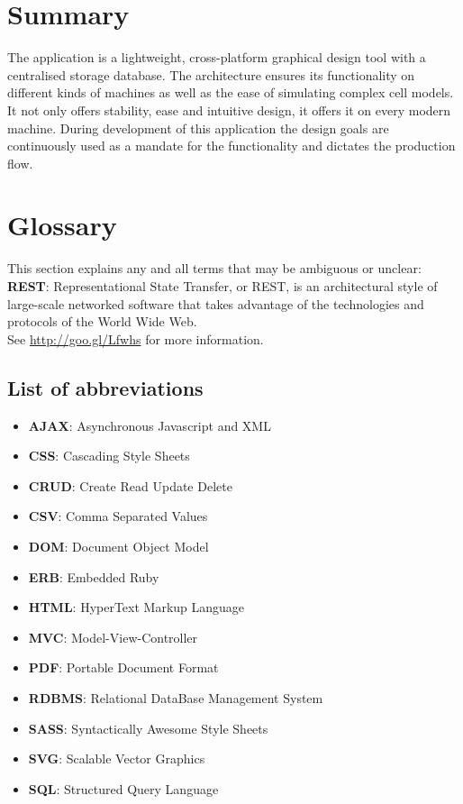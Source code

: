 \documentclass{report}
\begin{document}
	\section{Summary}
		The application is a lightweight, cross-platform graphical design tool with a centralised storage database. The architecture ensures its functionality on different kinds of machines as well as the ease of simulating complex cell models. It not only offers stability, ease and intuitive design, it offers it on every modern machine. During development of this application the design goals are continuously used as a mandate for the functionality and dictates the production flow.
	\section{Glossary}
		This section explains any and all terms that may be ambiguous or unclear:\\
		
		\textbf{REST}: Representational State Transfer, or REST, is an architectural style of large-scale networked software that takes advantage of the technologies and protocols of the World Wide Web. \\
See \href{http://goo.gl/Lfwhs}{http://goo.gl/Lfwhs} for more information.

		\subsection{List of abbreviations}
			\begin{itemize}
				\item \textbf{AJAX}: Asynchronous Javascript and XML
				\item \textbf{CSS}: Cascading Style Sheets
				\item \textbf{CRUD}: Create Read Update Delete 
				\item \textbf{CSV}: Comma Separated Values
				\item \textbf{DOM}: Document Object Model
				\item \textbf{ERB}: Embedded Ruby
				\item \textbf{HTML}: HyperText Markup Language
				\item \textbf{MVC}: Model-View-Controller
				\item \textbf{PDF}: Portable Document Format
				\item \textbf{RDBMS}: Relational DataBase Management System
				\item \textbf{SASS}: Syntactically Awesome Style Sheets
				\item \textbf{SVG}: Scalable Vector Graphics
				\item \textbf{SQL}: Structured Query Language
			\end{itemize}
\clearpage
\end{document}
